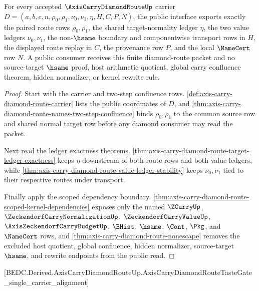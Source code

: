 \begin{theorem}
\label{thm:axis-carry-diamond-route-public-export}
For every accepted $\AxisCarryDiamondRouteUp$ carrier $D=(a,b,c,n,\rho_0,\rho_1,\nu_0,\nu_1,\eta,H,C,P,N)$, the public interface exports exactly the paired route rows $\rho_0,\rho_1$, the shared target-normality ledger $\eta$, the two value ledgers $\nu_0,\nu_1$, the non-$\hsame$ boundary and componentwise transport rows in $H$, the displayed route replay in $C$, the provenance row $P$, and the local $\NameCert$ row $N$. A public consumer receives this finite diamond-route packet and no source-target $\hsame$ proof, host arithmetic quotient, global carry confluence theorem, hidden normalizer, or kernel rewrite rule.
\end{theorem}
\begin{proof}
Start with the carrier and two-step confluence rows. \autoref{def:axis-carry-diamond-route-carrier} lists the public coordinates of $D$, and \autoref{thm:axis-carry-diamond-route-names-two-step-confluence} binds $\rho_0,\rho_1$ to the common source row and shared normal target row before any diamond consumer may read the packet.

Next read the ledger exactness theorems. \autoref{thm:axis-carry-diamond-route-target-ledger-exactness} keeps $\eta$ downstream of both route rows and both value ledgers, while \autoref{thm:axis-carry-diamond-route-value-ledger-stability} keeps $\nu_0,\nu_1$ tied to their respective routes under transport.

Finally apply the scoped dependency boundary. \autoref{thm:axis-carry-diamond-route-scoped-kernel-dependencies} exposes only the named $\ZCarryUp$, $\ZeckendorfCarryNormalizationUp$, $\ZeckendorfCarryValueUp$, $\AxisZeckendorfCarryBudgetUp$, $\BHist$, $\hsame$, $\Cont$, $\Pkg$, and $\NameCert$ rows, and \autoref{thm:axis-carry-diamond-route-nonescape} removes the excluded host quotient, global confluence, hidden normalizer, source-target $\hsame$, and rewrite endpoints from the public read.
\end{proof}

[BEDC.Derived.AxisCarryDiamondRouteUp.AxisCarryDiamondRouteTasteGate\_single\_carrier\_alignment]

